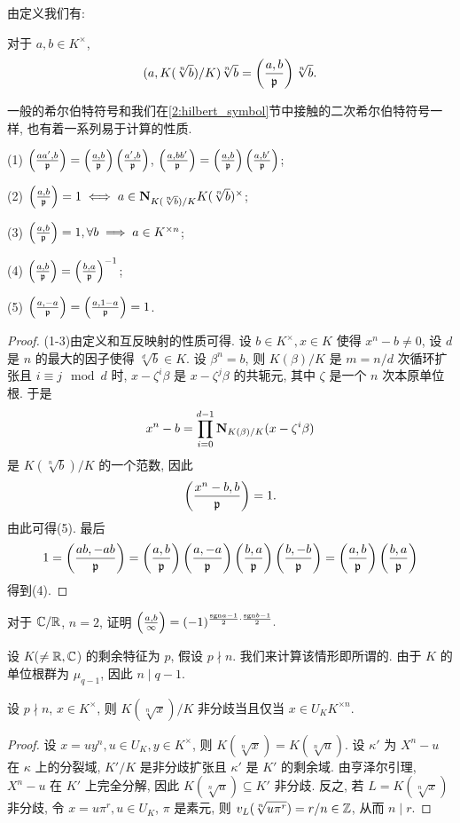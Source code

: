 由定义我们有:
\begin{proposition}{}{}
对于 $a,b\in K^\times$,
  \[(a,K(\sqrt[n]{b})/K)\sqrt[n]{b}=\left(\frac{{a},{b}}{{\mathfrak{p}}}\right)\sqrt[n]{b}.\]
\end{proposition}

一般的希尔伯特符号和我们在\ref{2:hilbert_symbol}节中接触的二次希尔伯特符号一样, 也有着一系列易于计算的性质.
\begin{proposition}{}{}
(1) $\left(\frac{{aa'},{b}}{{\mathfrak{p}}}\right)=\left(\frac{{a},{b}}{{\mathfrak{p}}}\right)\left(\frac{{a'},{b}}{{\mathfrak{p}}}\right)$, $\left(\frac{{a},{bb'}}{{\mathfrak{p}}}\right)=\left(\frac{{a},{b}}{{\mathfrak{p}}}\right)\left(\frac{{a},{b'}}{{\mathfrak{p}}}\right)$;

(2) $\left(\frac{{a},{b}}{{\mathfrak{p}}}\right)=1\iff a\in{\mathbf{N}}_{K(\sqrt[n]{b})/K}K(\sqrt[n]{b})^\times$;

(3) $\left(\frac{{a},{b}}{{\mathfrak{p}}}\right)=1,\forall b\implies a\in K^{\times n}$;

(4) $\left(\frac{{a},{b}}{{\mathfrak{p}}}\right)=\left(\frac{{b},{a}}{{\mathfrak{p}}}\right)^{-1}$;

(5) $\left(\frac{{a},{-a}}{{\mathfrak{p}}}\right)=\left(\frac{{a},{1-a}}{{\mathfrak{p}}}\right)=1$.
\end{proposition}
\begin{proof}
(1-3)由定义和互反映射的性质可得. 设 $b\in K^\times,x\in K$ 使得 $x^n-b\neq 0$, 设 $d$ 是 $n$ 的最大的因子使得 $\sqrt[d]{b}\in K$. 设 $\beta^n=b$, 则 $K(\beta)/K$ 是 $m=n/d$ 次循环扩张且 $i\equiv j\mod d$ 时, $x-\zeta^i\beta$ 是 $x-\zeta^j\beta$ 的共轭元, 其中 $\zeta$ 是一个 $n$ 次本原单位根. 于是
  \[x^n-b=\prod_{i=0}^{d-1}{\mathbf{N}}_{K(\beta)/K}(x-\zeta^i \beta)\]
是 $K(\sqrt[n]{b})/K$ 的一个范数, 因此
  \[\left(\frac{{x^n-b},{b}}{{\mathfrak{p}}}\right)=1.\]
由此可得(5). 最后
  \[1=\left(\frac{{ab},{-ab}}{{\mathfrak{p}}}\right)=\left(\frac{{a},{b}}{{\mathfrak{p}}}\right)\left(\frac{{a},{-a}}{{\mathfrak{p}}}\right)\left(\frac{{b},{a}}{{\mathfrak{p}}}\right)\left(\frac{{b},{-b}}{{\mathfrak{p}}}\right)=\left(\frac{{a},{b}}{{\mathfrak{p}}}\right)\left(\frac{{b},{a}}{{\mathfrak{p}}}\right)\]
得到(4).
\end{proof}

\begin{exercise}
对于 ${\mathbb{C}}/{\mathbb{R}}$, $n=2$, 证明 $\left(\frac{{a},{b}}{\infty}\right)=(-1)^{\frac{{\mathrm{sgn}} a-1}{2}\cdot\frac{{\mathrm{sgn}} b-1}{2}}.$
\end{exercise}

设 $K$($\neq{\mathbb{R}},{\mathbb{C}}$) 的剩余特征为 $p$, 假设 $p\nmid n$. 我们来计算该情形即所谓的. 由于 $K$ 的单位根群为 $\mu_{q-1}$, 因此 $n\mid q-1$.

\begin{lemma}{}{}
设 $p\nmid n$, $x\in K^\times$, 则 $K(\sqrt[n]{x})/K$ 非分歧当且仅当 $x\in U_K K^{\times n}$.
\end{lemma}
\begin{proof}
设 $x=uy^n,u\in U_K,y\in K^\times$, 则 $K(\sqrt[n]{x})=K(\sqrt[n]{u})$. 设 $\kappa'$ 为 $X^n-u$ 在 $\kappa$ 上的分裂域, $K'/K$ 是非分歧扩张且 $\kappa'$ 是 $K'$ 的剩余域. 由亨泽尔引理, $X^n-u$ 在 $K'$ 上完全分解, 因此 $K(\sqrt[n]{u})\subseteq K'$ 非分歧. 反之, 若 $L=K(\sqrt[n]{x})$ 非分歧, 令 $x=u\pi^r,u\in U_K$, $\pi$ 是素元, 则 $v_L(\sqrt[n]{u\pi^r})=r/n\in{\mathbb{Z}}$, 从而 $n\mid r$.
\end{proof}

